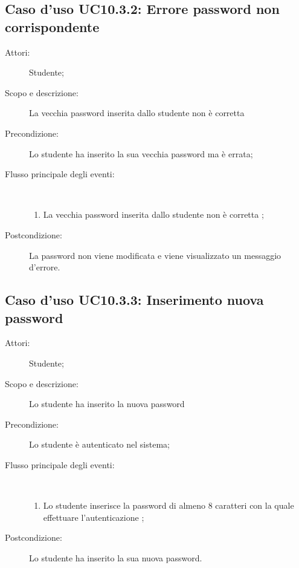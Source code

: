 \subsection{Caso d'uso UC10.3.2: Errore password non corrispondente}\begin{description}
	\item[Attori:] Studente;
	\item[Scopo e descrizione:] La vecchia password inserita dallo studente non è corretta
	\item[Precondizione:] Lo studente ha inserito la sua vecchia password ma è errata;
	
	\item[Flusso principale degli eventi:] \ 
	\begin{enumerate}
		\item La vecchia password inserita dallo studente non è corretta
		;
		
	\end{enumerate}
	\item[Postcondizione:] La password non viene modificata e viene visualizzato un messaggio d'errore.
\end{description}
\hypertarget{UC10.3.3}{}
\subsection{Caso d'uso UC10.3.3: Inserimento nuova password}\begin{description}
	\item[Attori:] Studente;
	\item[Scopo e descrizione:] Lo studente ha inserito la nuova password
	\item[Precondizione:] Lo studente è autenticato nel sistema;
	
	\item[Flusso principale degli eventi:] \ 
	\begin{enumerate}
		\item Lo studente inserisce la password di almeno 8 caratteri con la quale effettuare l'autenticazione	;
		
	\end{enumerate}
	\item[Postcondizione:] Lo studente ha inserito la sua nuova password.
\end{description}
\hypertarget{UC10.4}{}
